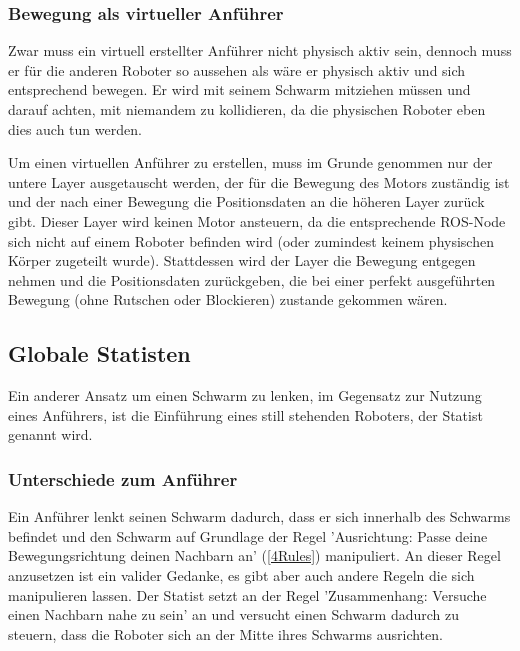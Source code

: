 \subsubsection*{Bewegung als virtueller Anführer}

Zwar muss ein virtuell erstellter Anführer nicht physisch aktiv sein, dennoch muss er für die anderen Roboter so aussehen als wäre er physisch aktiv und sich entsprechend bewegen. Er wird mit seinem Schwarm mitziehen müssen und darauf achten, mit niemandem zu kollidieren, da die physischen Roboter eben dies auch tun werden.

Um einen virtuellen Anführer zu erstellen, muss im Grunde genommen nur der untere Layer ausgetauscht werden, der für die Bewegung des Motors zuständig ist und der nach einer Bewegung die Positionsdaten an die höheren Layer zurück gibt.
Dieser Layer wird keinen Motor ansteuern, da die entsprechende \ac{ROS}-Node sich nicht auf einem Roboter befinden wird (oder zumindest keinem physischen Körper zugeteilt wurde). Stattdessen wird der Layer die Bewegung entgegen nehmen und die Positionsdaten zurückgeben, die bei einer perfekt ausgeführten Bewegung (ohne Rutschen oder Blockieren) zustande gekommen wären.





\subsection{Globale Statisten}

Ein anderer Ansatz um einen Schwarm zu lenken, im Gegensatz zur Nutzung eines Anführers, ist die Einführung eines still stehenden Roboters, der Statist genannt wird.

\subsubsection*{Unterschiede zum Anführer}

Ein Anführer lenkt seinen Schwarm dadurch, dass er sich innerhalb des Schwarms befindet und den Schwarm auf Grundlage der Regel 'Ausrichtung: Passe deine Bewegungsrichtung deinen Nachbarn an' (\autoref{4Rules}) manipuliert. An dieser Regel anzusetzen ist ein valider Gedanke, es gibt aber auch andere Regeln die sich manipulieren lassen. Der Statist setzt an der Regel 'Zusammenhang: Versuche einen Nachbarn nahe zu sein' an und versucht einen Schwarm dadurch zu steuern, dass die Roboter sich an der Mitte ihres Schwarms ausrichten.

